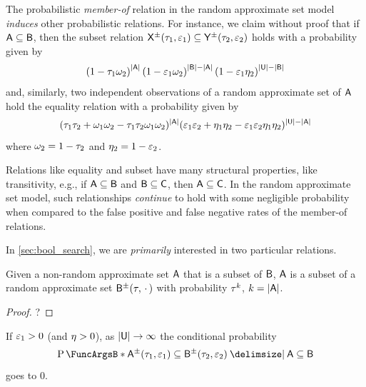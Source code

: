 \documentclass[11pt,final,hidelinks]{article}
\begin{document}
The probabilistic \emph{member-of} relation in the random approximate set model \emph{induces} other probabilistic relations. For instance, we claim without proof that if $\Set{A} \subseteq \Set{B}$, then the subset relation $\ASet{X}(\tprate_1,\fprate_1) \subseteq \ASet{Y}(\tprate_2,\fprate_2)$ holds with a probability given by
\begin{equation}
\left(1 - \tprate_1 \fnrate_2 \right)^{\Card{\Set{A}}}
\left(1 - \fprate_1\fnrate_2\right)^{\Card{\Set{B}} - \Card{\Set{A}}}
\left(1 - \fprate_1 \tnrate_2\right)^{\Card{\Set{U}} - 
	\Card{\Set{B}}}
\end{equation}
and, similarly, two independent observations of a random approximate set of $\Set{A}$ hold the equality relation with a probability given by
\begin{equation}
(\tprate_1 \tprate_2 + \fnrate_1 \fnrate_2 - \tprate_1 \tprate_2 \fnrate_1 \fnrate_2)^{\Card{\Set{A}}} (\fprate_1 \fprate_2 + \tnrate_1 \tnrate_2 - \fprate_1 \fprate_2 \tnrate_1 \tnrate_2)^{\Card{\Set{U}} - \Card{\Set{A}}}
\end{equation}
where $\omega_2 = 1 - \tau_2$ and $\eta_2 = 1 - \varepsilon_2$.

Relations like equality and subset have many structural properties, like transitivity, e.g., if $\Set{A} \subseteq \Set{B}$ and $\Set{B} \subseteq \Set{C}$, then $\Set{A} \subseteq \Set{C}$.
In the random approximate set model, such relationships \emph{continue} to hold with some negligible probability when compared to the false positive and false negative rates of the member-of relations.

In \cref{sec:bool_search}, we are \emph{primarily} interested in two particular relations.
\begin{theorem}
	Given a non-random approximate set $\Set{A}$ that is a subset of $\Set{B}$, $\Set{A}$ is a subset of a random approximate set $\ASet{B}(\tprate,\,\cdot\,)$ with probability $\tau^k$, $k=\Card{\Set{A}}$.
\end{theorem}
\begin{proof}
	?
\end{proof}

If $\varepsilon_1 > 0$ (and $\eta > 0$), as $\Card{\Set{U}} \to \infty$ the conditional probability
\begin{equation}
\Prob{\ASet{A}(\tprate_1,\fprate_1) \subseteq \ASet{B}(\tprate_2,\fprate_2) \Given \Set{A} \subseteq \Set{B}}
\end{equation}
goes to $0$.
\end{document}
